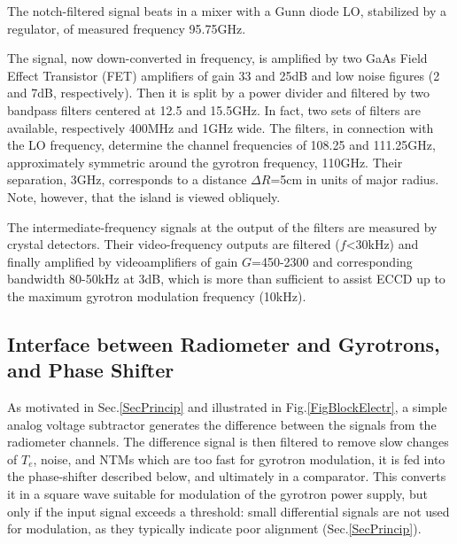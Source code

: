 \documentclass[aps,pra,twocolumn]{revtex4}
\begin{document}
The notch-filtered signal beats in a mixer with a Gunn diode LO,  
stabilized by a regulator, of measured frequency 
95.75GHz. 

The signal, now down-converted in frequency, is amplified by 
two GaAs Field Effect Transistor (FET) amplifiers of gain
33 and 25dB and low noise figures (2 and 7dB, respectively). 
Then it is split by a power divider and filtered by two bandpass filters 
centered at 12.5 and 15.5GHz. In fact, two sets of filters are available, 
respectively 400MHz and 1GHz wide.
The filters, in connection with the LO frequency, determine the channel 
frequencies of 108.25 and 111.25GHz, approximately symmetric around the gyrotron
frequency, 110GHz. Their separation, 3GHz, corresponds to a distance 
$\Delta R$=5cm in units of major radius. Note, however, that the island is 
viewed obliquely. 

The intermediate-frequency signals at the output of the filters
are measured by crystal detectors.  Their video-frequency outputs are
filtered ($f$<30kHz) and finally 
amplified by videoamplifiers of gain 
$G$=450-2300 and corresponding bandwidth 80-50kHz at 3dB, 
which is more than sufficient to assist ECCD up to the maximum 
gyrotron modulation frequency (10kHz).



\subsection{Interface between Radiometer and Gyrotrons, and Phase Shifter} 
\label{SecInterf}
As motivated in Sec.\ref{SecPrincip} and illustrated in 
Fig.\ref{FigBlockElectr}, a simple analog voltage subtractor generates 
the difference between the signals from the radiometer channels. 
The difference signal is then filtered to remove slow changes of $T_e$, 
noise, and NTMs which are too fast for gyrotron modulation, it is 
fed into the phase-shifter described below, and ultimately in a 
comparator. This converts it in a square wave suitable for modulation of the 
gyrotron power supply, but only if the input signal exceeds a threshold: small 
differential signals are not used for modulation, as they typically indicate 
poor alignment (Sec.\ref{SecPrincip}). 
\end{document}
